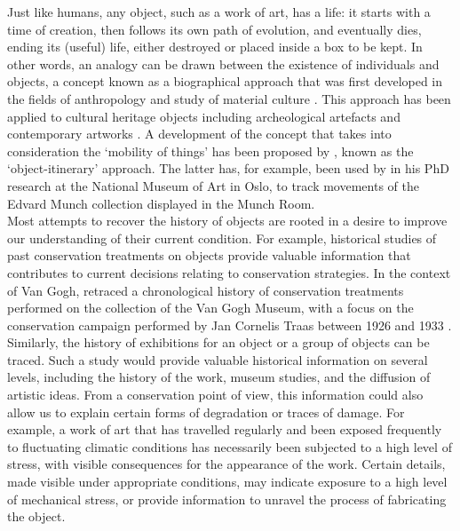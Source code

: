 Just like humans, any object, such as a work of art, has a life: it starts with a time of creation, then follows its own path of evolution, and eventually dies, ending its (useful) life, either destroyed or placed inside a box to be kept. In other words, an analogy can be drawn between the existence of individuals and objects, a concept known as a biographical approach that was first developed in the fields of anthropology and study of material culture \citep{appadurai_social_1986, kopytoff_cultural_1986}. This approach has been applied to cultural heritage objects including archeological artefacts \citep{joy_reinvigorating_2009, pye_engaging_2019} and contemporary artworks \citep{quabeck_reframing_2021, van_de_vall_reflections_2011}. A development of the concept that takes into consideration the ‘mobility of things’ has been proposed by \citet{joyce_things_2015}, known as the ‘object-itinerary’ approach. The latter has, for example, been used by \citet{ford_revisiting_2022} in his PhD research at the National Museum of Art in Oslo, to track movements of the Edvard Munch collection displayed in the Munch Room. \\

Most attempts to recover the history of objects are rooted in a desire to improve our understanding of their current condition. For example, historical studies of past conservation treatments on objects provide valuable information that contributes to current decisions relating to conservation strategies. In the context of Van Gogh, \citet[28–36]{hendriks_vincent_2011} retraced a chronological history of conservation treatments performed on the collection of the Van Gogh Museum, with a focus on the conservation campaign performed by Jan Cornelis Traas between 1926 and 1933 \citep{hendriks_art_2022}. Similarly, the history of exhibitions for an object or a group of objects can be traced. Such a study would provide valuable historical information on several levels, including the history of the work, museum studies, and the diffusion of artistic ideas. From a conservation point of view, this information could also allow us to explain certain forms of degradation or traces of damage. For example, a work of art that has travelled regularly and been exposed frequently to fluctuating climatic conditions has necessarily been subjected to a high level of stress, with visible consequences for the appearance of the work. Certain details, made visible under appropriate conditions, may indicate exposure to a high level of mechanical stress, or provide information to unravel the process of fabricating the object. \\

